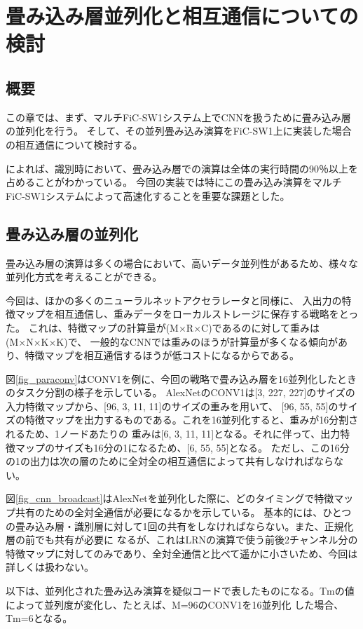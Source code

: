 \chapter{畳み込み層並列化と相互通信についての検討}
\section{概要}
この章では、まず、マルチFiC-SW1システム上でCNNを扱うために畳み込み層の並列化を行う。
そして、その並列畳み込み演算をFiC-SW1上に実装した場合の相互通信について検討する。

\cite{fpgaopt}によれば、識別時において、畳み込み層での演算は全体の実行時間の90％以上を占めることがわかっている。
今回の実装では特にこの畳み込み演算をマルチFiC-SW1システムによって高速化することを重要な課題とした。

\section{畳み込み層の並列化}
畳み込み層の演算は多くの場合において、高いデータ並列性があるため、様々な並列化方式を考えることができる。

今回は、ほかの多くのニューラルネットアクセラレータ\cite{fpgaopt}\cite{dadiannao}と同様に、
入出力の特徴マップを相互通信し、重みデータをローカルストレージに保存する戦略をとった。
これは、特徴マップの計算量が(M×R×C)であるのに対して重みは(M×N×K×K)で、
一般的なCNNでは重みのほうが計算量が多くなる傾向があり、特徴マップを相互通信するほうが低コストになるからである。

図\ref{fig_paraconv}はCONV1を例に、今回の戦略で畳み込み層を16並列化したときのタスク分割の様子を示している。
AlexNetのCONV1は[3, 227, 227]のサイズの入力特徴マップから、[96, 3, 11, 11]のサイズの重みを用いて、
[96, 55, 55]のサイズの特徴マップを出力するものである。これを16並列化すると、重みが16分割されるため、1ノードあたりの
重みは[6, 3, 11, 11]となる。それに伴って、出力特徴マップのサイズも16分の1になるため、[6, 55, 55]となる。
ただし、この16分の1の出力は次の層のために全対全の相互通信によって共有しなければならない。

図\ref{fig_cnn_broadcast}はAlexNetを並列化した際に、どのタイミングで特徴マップ共有のための全対全通信が必要になるかを示している。
基本的には、ひとつの畳み込み層・識別層に対して1回の共有をしなければならない。また、正規化層の前でも共有が必要に
なるが、これはLRNの演算で使う前後2チャンネル分の特徴マップに対してのみであり、全対全通信と比べて遥かに小さいため、今回は詳しくは扱わない。

以下は、並列化された畳み込み演算を疑似コードで表したものになる。Tmの値によって並列度が変化し、たとえば、M=96のCONV1を16並列化
した場合、Tm=6となる。

